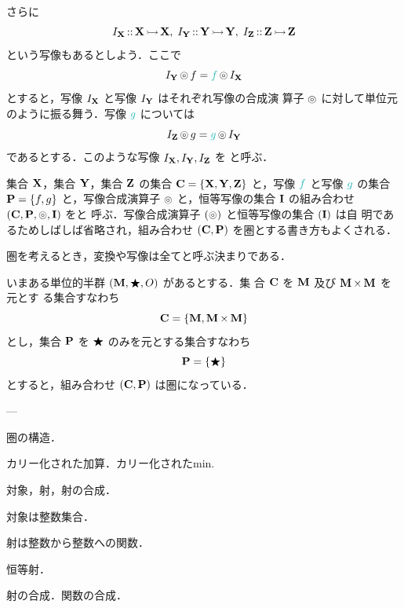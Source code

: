 \documentclass[a5paper,twoside,fleqn,draft]{jsbook}
\begin{document}
さらに
\begin{equation}
I_{\mathbf{X}}\operatorname{{:\!:}}\mathbf{X}\operatorname{\rightarrowtail}\mathbf{X},\;
I_{\mathbf{Y}}\operatorname{{:\!:}}\mathbf{Y}\operatorname{\rightarrowtail}\mathbf{Y},\;
I_{\mathbf{Z}}\operatorname{{:\!:}}\mathbf{Z}\operatorname{\rightarrowtail}\mathbf{Z}
\end{equation}
という写像もあるとしよう．ここで
\begin{equation}
I_\mSet{Y}\mCompProj f=\hFunc{f}\mCompProj I_\mSet{X}
\end{equation}
とすると，写像 $I_{\mathbf{X}}$ と写像 $I_{\mathbf{Y}}$ はそれぞれ写像の合成演
算子 $\operatorname{\circledcirc}$ に対して単位元のように振る舞う．写像 $\hFunc{g}$ については
\begin{equation}
I_\mSet{Z}\mCompProj g=\hFunc{g}\mCompProj I_\mSet{Y}
\end{equation}
であるとする．このような写像 $I_{\mathbf{X}},I_{\mathbf{Y}},I_{\mathbf{Z}}$ を
と呼ぶ．

集合 $\mathbf{X}$，集合 $\mathbf{Y}$，集合 $\mathbf{Z}$ の集合
$\mathbf{C}=\{\mathbf{X},\mathbf{Y},\mathbf{Z}\}$ と，写像 $\hFunc{f}$ と写像
$\hFunc{g}$ の集合 $\mathbf{P}=\{f,g\}$ と，写像合成演算子 $\operatorname{\circledcirc}$
と，恒等写像の集合 $\mathbf{I}$ の組み合わせ
$\left(\mathbf{C},\mathbf{P},\operatorname{\circledcirc},\mathbf{I}\right)$ をと
呼ぶ．写像合成演算子 $(\operatorname{\circledcirc})$ と恒等写像の集合 $(\mathbf{I})$ は自
明であるためしばしば省略され，組み合わせ
$\left(\mathbf{C},\mathbf{P}\right)$ を圏とする書き方もよくされる．

圏を考えるとき，変換や写像は全てと呼ぶ決まりである．

いまある単位的半群 $\left(\mathbf{M},\operatorname{\bigstar},O\right)$ があるとする．集
合 $\mathbf{C}$ を $\mathbf{M}$ 及び $\mathbf{M}\operatorname{\bf{\times}}\mathbf{M}$ を元とす
る集合すなわち
\begin{equation}
\mathbf{C}=\{\mathbf{M},\mathbf{M}\operatorname{\bf{\times}}\mathbf{M}\}
\end{equation}
とし，集合 $\mathbf{P}$ を $\operatorname{\bigstar}$ のみを元とする集合すなわち
\begin{equation}
\mathbf{P}=\{\operatorname{\bigstar}\}
\end{equation}
とすると，組み合わせ $\left(\mathbf{C},\mathbf{P}\right)$ は圏になっている．

---

圏の構造．

カリー化された加算．カリー化されたmin.

対象，射，射の合成．

対象は整数集合．

射は整数から整数への関数．

恒等射．

射の合成．関数の合成．
\end{document}
